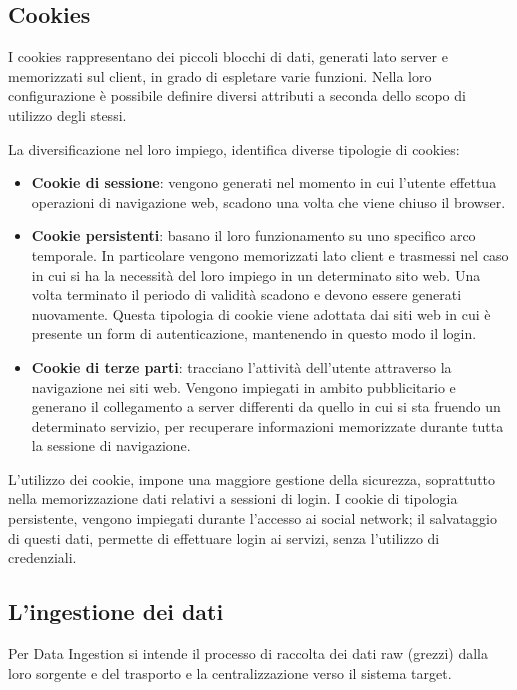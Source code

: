 \subsection{Cookies} \label{cookieitem}
I cookies rappresentano dei piccoli blocchi di dati, generati lato server e memorizzati sul client, in grado di espletare varie funzioni.
Nella loro configurazione \`e possibile definire diversi attributi a seconda dello scopo di utilizzo degli stessi.

La diversificazione nel loro impiego, identifica diverse tipologie di cookies: 
\begin{itemize}
    \item \textbf{Cookie di sessione}: vengono generati nel momento in cui l'utente effettua operazioni di navigazione web, scadono una volta che viene chiuso il browser.
    \item \textbf{Cookie persistenti}: basano il loro funzionamento su uno specifico arco temporale. In particolare vengono memorizzati lato client e trasmessi nel caso in cui si ha la necessit\`a del loro impiego in un determinato sito web. Una volta terminato il periodo di validit\`a scadono e devono essere generati nuovamente.
    Questa tipologia di cookie viene adottata dai siti web in cui \`e presente un form di autenticazione, mantenendo in questo modo il login.
    \item \textbf{Cookie di terze parti}: tracciano l'attivit\`a dell'utente attraverso la navigazione nei siti web. Vengono impiegati in ambito pubblicitario e generano il collegamento a server differenti da quello in cui si sta fruendo un determinato servizio, per recuperare informazioni memorizzate durante tutta la sessione di navigazione. 
\end{itemize}
L'utilizzo dei cookie, impone una maggiore gestione della sicurezza, soprattutto nella memorizzazione dati relativi a sessioni di login.\cite{kristol2000http}
I cookie di tipologia persistente, vengono impiegati durante l'accesso ai social network;  il salvataggio di questi dati, permette di effettuare login ai servizi, senza l'utilizzo di credenziali.

\subsection{L'ingestione dei dati}
Per Data Ingestion si intende il processo di raccolta dei dati raw (grezzi) dalla loro sorgente e del trasporto e la centralizzazione verso il sistema target.\cite{meehan2017data}

